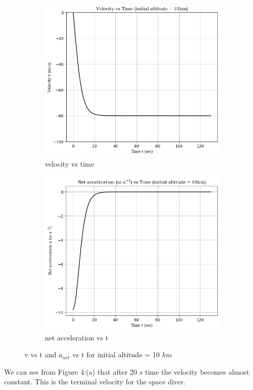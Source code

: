 \documentclass[a4paper, 14pt]{extarticle}
\begin{document}
\begin{figure}[ht]
  \begin{subfigure}{0.5\textwidth}
    \includegraphics[width=\linewidth]{10-2}
    \caption{velocity vs time}
  \end{subfigure}
  \hfill
  \begin{subfigure}{0.5\textwidth}
    \includegraphics[width=\linewidth]{10-3}
    \caption{net acceleration vs t}
  \end{subfigure}
  \caption{v vs t and $a_{net}$ vs t for initial altitude = 10 $km$}
\end{figure}
We can see from Figure 4:(a) that after 20 $s$ time the velocity becomes almost constant. This is the terminal velocity for the space diver.
\end{document}

